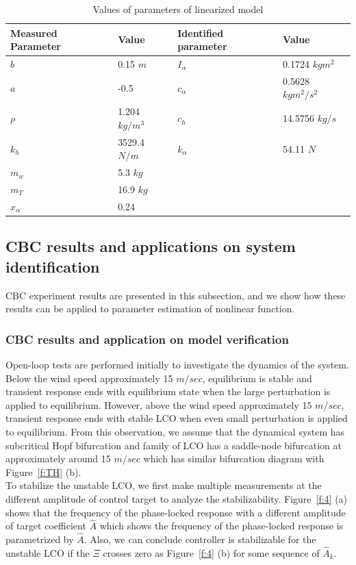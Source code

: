 \documentclass[openacc]{rsproca_new}%
\newcommand{\Fref}[1]{Figure~\ref{#1}}
\begin{document}
\begin{table}[!ht]
\caption{Values of parameters of linearized model}%
\label{t2}
\begin{tabular}{llll}%
\hline
Measured Parameter & Value & Identified parameter & Value \\
\hline
$b$ & 0.15  $m$ & $I_{\alpha}$ & 0.1724  $kgm^2$ \\
$a$ & -0.5 & $c_\alpha$ & 0.5628  $kgm^2/s^2$ \\
$\rho$ & 1.204  $kg/m^3$ & $c_h$  & 14.5756  $kg/s$ \\
$k_{h}$ & 3529.4  $N/m$ & $k_\alpha$ & 54.11  $N$ \\
$m_w$ & 5.3  $kg$ & & \\
$m_T$ &  16.9  $kg$ & &  \\
$x_\alpha$ & 0.24 & & \\
\hline
\end{tabular}
\vspace*{-4pt}
\end{table}%

\subsection{CBC results and applications on system identification}\label{results}
CBC experiment results are presented in this subsection, and we show how these results can be applied to parameter estimation of nonlinear function.
\subsubsection{CBC results and application on model verification}\label{lin_sys}
Open-loop tests are performed initially to investigate the dynamics of the system. Below the wind speed approximately 15 $m/sec$, equilibrium is stable and transient response ends with equilibrium state when the large perturbation is applied to equilibrium. However, above the wind speed approximately 15 $m/sec$, transient response ends with stable LCO when even small perturbation is applied to equilibrium. From this observation, we assume that the dynamical system has subcritical Hopf bifurcation and family of LCO has a saddle-node bifurcation at approximately around 15 $m/sec$ which has similar bifurcation diagram with \Fref{f:TH} (b).\\
To stabilize the unstable LCO, we first make multiple measurements at the different amplitude of control target to analyze the stabilizability. \Fref{f:4} (a) shows that the frequency of the phase-locked response with a different amplitude of target coefficient $\hat A$ which shows the frequency of the phase-locked response is parametrized by $\hat A$. Also, we can conclude controller is stabilizable for the unstable LCO if the $\Xi$ crosses zero as \Fref{f:4} (b) for some sequence of $\hat A_k$.
\end{document}

